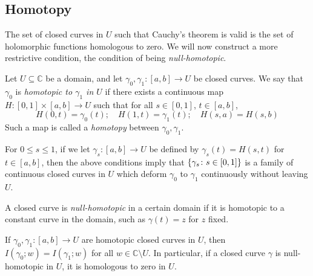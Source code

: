 \subsection{Homotopy}
The set of closed curves in \( U \) such that Cauchy's theorem is valid is the set of holomorphic functions homologous to zero.
We will now construct a more restrictive condition, the condition of being \textit{null-homotopic}.
\begin{definition}
	Let \( U \subseteq \mathbb C \) be a domain, and let \( \gamma_0, \gamma_1 \colon [a,b] \to U \) be closed curves.
	We say that \( \gamma_0 \) is \textit{homotopic to \( \gamma_1 \) in \( U \)} if there exists a continuous map \( H \colon [0,1] \times [a,b] \to U \) such that for all \( s \in [0,1] \), \( t \in [a,b] \),
	\[
		H(0,t) = \gamma_0(t);\quad H(1,t) = \gamma_1(t);\quad H(s,a) = H(s,b)
	\]
	Such a map is called a \textit{homotopy} between \( \gamma_0, \gamma_1 \).
\end{definition}
For \( 0 \leq s \leq 1 \), if we let \( \gamma_s\colon [a,b] \to U \) be defined by \( \gamma_s(t) = H(s,t) \) for \( t \in [a,b] \), then the above conditions imply that \( \qty{\gamma_s \colon s \in [0,1]} \) is a family of continuous closed curves in \( U \) which deform \( \gamma_0 \) to \( \gamma_1 \) continuously without leaving \( U \).
\begin{definition}
	A closed curve is \textit{null-homotopic} in a certain domain if it is homotopic to a constant curve in the domain, such as \( \gamma(t) = z \) for \( z \) fixed.
\end{definition}
\begin{theorem}
	If \( \gamma_0, \gamma_1 \colon [a,b] \to U \) are homotopic closed curves in \( U \), then \( I(\gamma_0; w) = I(\gamma_1;w) \) for all \( w \in \mathbb C \setminus U \).
	In particular, if a closed curve \( \gamma \) is null-homotopic in \( U \), it is homologous to zero in \( U \).
\end{theorem}
